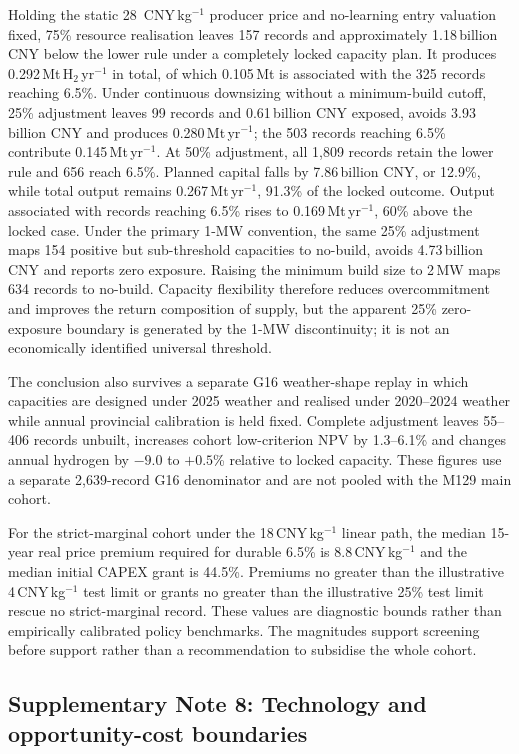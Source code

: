 \documentclass[11pt,a4paper]{article}
\newcommand{\cnykg}{CNY\,kg$^{-1}$}
\begin{document}
Holding the static 28~\cnykg{} producer price and no-learning entry valuation fixed, 75\% resource realisation leaves 157 records and approximately 1.18\,billion CNY below the lower rule under a completely locked capacity plan. It produces 0.292\,Mt\,H$_2$\,yr$^{-1}$ in total, of which 0.105\,Mt is associated with the 325 records reaching 6.5\%. Under continuous downsizing without a minimum-build cutoff, 25\% adjustment leaves 99 records and 0.61\,billion CNY exposed, avoids 3.93\,billion CNY and produces 0.280\,Mt\,yr$^{-1}$; the 503 records reaching 6.5\% contribute 0.145\,Mt\,yr$^{-1}$. At 50\% adjustment, all 1,809 records retain the lower rule and 656 reach 6.5\%. Planned capital falls by 7.86\,billion CNY, or 12.9\%, while total output remains 0.267\,Mt\,yr$^{-1}$, 91.3\% of the locked outcome. Output associated with records reaching 6.5\% rises to 0.169\,Mt\,yr$^{-1}$, 60\% above the locked case. Under the primary 1-MW convention, the same 25\% adjustment maps 154 positive but sub-threshold capacities to no-build, avoids 4.73\,billion CNY and reports zero exposure. Raising the minimum build size to 2\,MW maps 634 records to no-build. Capacity flexibility therefore reduces overcommitment and improves the return composition of supply, but the apparent 25\% zero-exposure boundary is generated by the 1-MW discontinuity; it is not an economically identified universal threshold.

The conclusion also survives a separate G16 weather-shape replay in which capacities are designed under 2025 weather and realised under 2020--2024 weather while annual provincial calibration is held fixed. Complete adjustment leaves 55--406 records unbuilt, increases cohort low-criterion NPV by 1.3--6.1\% and changes annual hydrogen by $-9.0$ to $+0.5$\% relative to locked capacity. These figures use a separate 2,639-record G16 denominator and are not pooled with the M129 main cohort.

For the strict-marginal cohort under the 18\,CNY\,kg$^{-1}$ linear path, the median 15-year real price premium required for durable 6.5\% is 8.8\,CNY\,kg$^{-1}$ and the median initial CAPEX grant is 44.5\%. Premiums no greater than the illustrative 4\,CNY\,kg$^{-1}$ test limit or grants no greater than the illustrative 25\% test limit rescue no strict-marginal record. These values are diagnostic bounds rather than empirically calibrated policy benchmarks. The magnitudes support screening before support rather than a recommendation to subsidise the whole cohort.

\subsection*{Supplementary Note 8: Technology and opportunity-cost boundaries}
\end{document}
